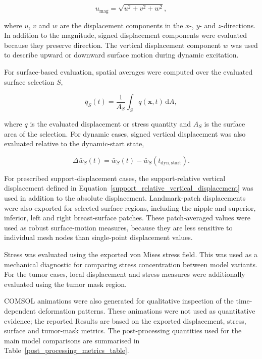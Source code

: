 \begin{equation}
u_{\mathrm{mag}}
=
\sqrt{u^{2}+v^{2}+w^{2}},
\label{displacement_magnitude_definition}
\end{equation}

where $u$, $v$ and $w$ are the displacement components in the $x$-, $y$- and $z$-directions. In addition to the magnitude, signed displacement components were evaluated because they preserve direction. The vertical displacement component $w$ was used to describe upward or downward surface motion during dynamic excitation.

For surface-based evaluation, spatial averages were computed over the evaluated surface selection $S$,

\begin{equation}
\bar{q}_{S}(t)
=
\frac{1}{A_{S}}
\int_{S} q(\mathbf{x},t)\,\mathrm{d}A,
\label{surface_average_metric}
\end{equation}

where $q$ is the evaluated displacement or stress quantity and $A_{S}$ is the surface area of the selection. For dynamic cases, signed vertical displacement was also evaluated relative to the dynamic-start state,

\begin{equation}
\Delta \bar{w}_{S}(t)
=
\bar{w}_{S}(t)
-
\bar{w}_{S}(t_{\mathrm{dyn,start}}).
\label{surface_vertical_displacement_from_dynamic_start}
\end{equation}

For prescribed support-displacement cases, the support-relative vertical displacement defined in Equation~\ref{support_relative_vertical_displacement} was used in addition to the absolute displacement. Landmark-patch displacements were also exported for selected surface regions, including the nipple and superior, inferior, left and right breast-surface patches. These patch-averaged values were used as robust surface-motion measures, because they are less sensitive to individual mesh nodes than single-point displacement values.

Stress was evaluated using the exported von Mises stress field. This was used as a mechanical diagnostic for comparing stress concentration between model variants. For the tumor cases, local displacement and stress measures were additionally evaluated using the tumor mask region.

COMSOL animations were also generated for qualitative inspection of the time-dependent deformation patterns. These animations were not used as quantitative evidence; the reported Results are based on the exported displacement, stress, surface and tumor-mask metrics. The post-processing quantities used for the main model comparisons are summarised in Table~\ref{post_processing_metrics_table}.

